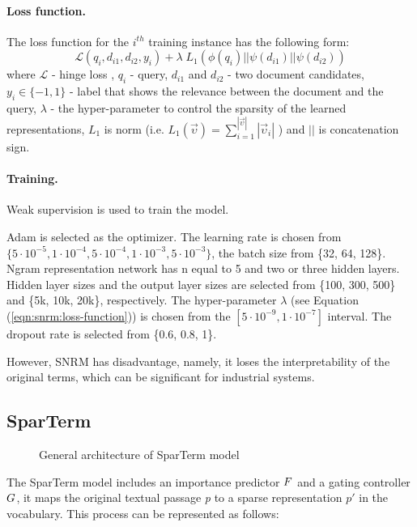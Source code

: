 \documentclass[
    twocolumn,
]{ceurart}
\begin{document}
    \paragraph{Loss function.}
    The loss function for the $i^{th}$ training instance has the following form:
    \begin{equation}
        \label{eqn:snrm:loss-function}
        \mathcal{L}(q_i,d_{i1},d_{i2},y_i) + \lambda\;L_1(\phi(q_i)||\psi(d_{i1})||\psi(d_{i2}))
    \end{equation}
    where $\mathcal{L}$ - hinge loss \cite{IRNLP}, $q_i$ - query, $d_{i1}$ and $d_{i2}$ - two
    document candidates, $y_i \in \{-1, 1\}$ - label that shows the relevance between the document
    and the query, $\lambda$ - the hyper-parameter to control the sparsity of the learned
    representations, $L_1$ is norm (i.e.
    \begin{math}
        L_1(\vec{\upsilon}) = \sum_{i=1}^{|\vec{\upsilon}|}|\vec{\upsilon}_i|
    \end{math}
    ) and $||$ is concatenation sign.

    \paragraph{Training.}
    Weak supervision is used to train the model.

    Adam is selected as the optimizer.
    The learning rate is chosen from
    ${\{5 \cdot 10^{-5}, 1 \cdot 10^{-4}, 5 \cdot 10^{-4}, 1 \cdot 10^{-3}, 5 \cdot 10^{-3}\}}$,
    the batch size from \{32, 64, 128\}.
    Ngram representation network has n equal to 5 and two or three hidden layers.
    Hidden layer sizes and the output layer sizes are selected from \{100, 300, 500\} and
    \{5k, 10k, 20k\}, respectively.
    The hyper-parameter $\lambda$ (see Equation (\ref{eqn:snrm:loss-function})) is chosen from the
    $[5 \cdot 10^{-9}, 1 \cdot 10^{-7}]$ interval.
    The dropout rate is selected from \{0.6, 0.8, 1\}.\\\par

    However, SNRM has disadvantage, namely, it loses the interpretability of the original terms,
    which can be significant for industrial systems.

    \subsection{SparTerm}

    \begin{figure}[h]
        \centering
        \def\svgwidth{\columnwidth}
        
        \caption{General architecture of SparTerm model}
    \end{figure}
    The SparTerm model includes an importance predictor $\mathnormal{F}$ and a gating controller
    $\mathnormal{G}$, it maps the original textual passage \emph{p} to a sparse representation
    $p'$ in the vocabulary.
    This process can be represented as follows:
\end{document}
